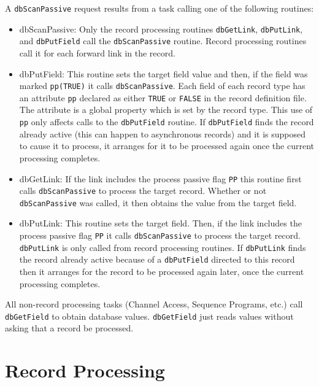 A \verb|dbScanPassive| request results from a task calling one of the following routines:

\begin{itemize}
\item {}dbScanPassive: Only the record processing routines \verb|dbGetLink|, \verb|dbPutLink|, and \verb|dbPutField| call the \verb|dbScanPassive| routine.
Record processing routines call it for each forward link in the record.

\item {}dbPutField: This routine sets the target field value and then, if the field was marked \verb|pp(TRUE)| it calls \verb|dbScanPassive|.
Each field of each record type has an attribute \verb|pp| declared as either \verb|TRUE| or \verb|FALSE| in the record definition file.
The attribute is a global property which is set by the record type.
This use of \verb|pp| only affects calls to the \verb|dbPutField| routine.
If \verb|dbPutField| finds the record already active (this can happen to asynchronous records) and it is supposed to cause it to process, it arranges for it to be processed again once the current processing completes.

\item {}dbGetLink:  If the link includes the process passive flag \verb|PP| this routine first calls \verb|dbScanPassive| to process the target record.
Whether or not \verb|dbScanPassive| was called, it then obtains the value from the target field.

\item {}dbPutLink:  This routine sets the target field.
Then, if the link includes the process passive flag \verb|PP| it calls \verb|dbScanPassive| to process the target record.
\verb|dbPutLink| is only called from record processing routines.
If \verb|dbPutLink| finds the record already active because of a \verb|dbPutField| directed to this record then it arranges for the record to be processed again later, once the current processing completes.

\end{itemize}

All non-record processing tasks (Channel Access, Sequence Programs, etc.) call \verb|dbGetField| to obtain database values.
\verb|dbGetField| just reads values without asking that a record be processed.

\section{Record Processing}

